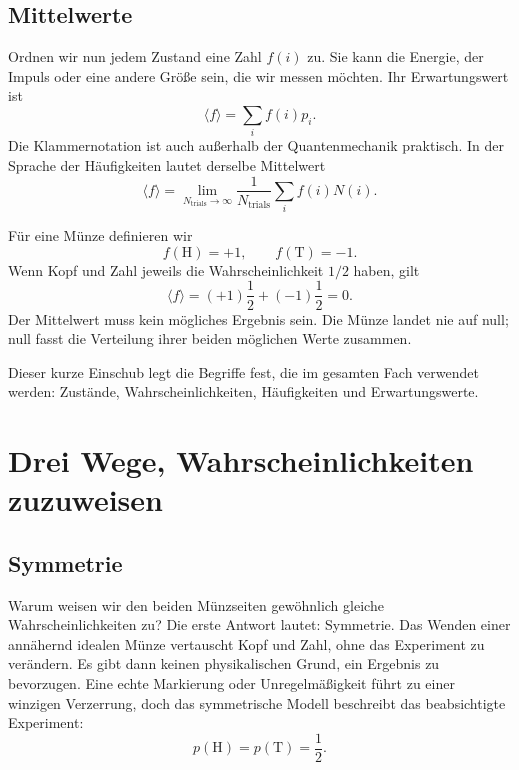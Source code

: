 \subsection{Mittelwerte}

Ordnen wir nun jedem Zustand eine Zahl \(f(i)\) zu. Sie kann die Energie, der Impuls oder eine andere Größe sein, die wir messen möchten. Ihr Erwartungswert ist
\begin{equation}
 \langle f\rangle=\sum_i f(i)p_i.
 \label{eq:sm1-expectation}
\end{equation}
Die Klammernotation ist auch außerhalb der Quantenmechanik praktisch. In der Sprache der Häufigkeiten lautet derselbe Mittelwert
\begin{equation}
 \langle f\rangle
 =
 \lim_{N_{\mathrm{trials}}\to\infty}
 \frac{1}{N_{\mathrm{trials}}}
 \sum_i f(i)N(i).
 \label{eq:sm1-frequency-average}
\end{equation}

Für eine Münze definieren wir
\begin{equation}
 f(\mathrm{H})=+1,
 \qquad
 f(\mathrm{T})=-1.
\end{equation}
Wenn Kopf und Zahl jeweils die Wahrscheinlichkeit \(1/2\) haben, gilt
\begin{equation}
 \langle f\rangle
 =(+1)\frac12+(-1)\frac12=0.
\end{equation}
Der Mittelwert muss kein mögliches Ergebnis sein. Die Münze landet nie auf null; null fasst die Verteilung ihrer beiden möglichen Werte zusammen.

Dieser kurze Einschub legt die Begriffe fest, die im gesamten Fach verwendet werden: Zustände, Wahrscheinlichkeiten, Häufigkeiten und Erwartungswerte.

\section{Drei Wege, Wahrscheinlichkeiten zuzuweisen}

\subsection{Symmetrie}

Warum weisen wir den beiden Münzseiten gewöhnlich gleiche Wahrscheinlichkeiten zu? Die erste Antwort lautet: Symmetrie. Das Wenden einer annähernd idealen Münze vertauscht Kopf und Zahl, ohne das Experiment zu verändern. Es gibt dann keinen physikalischen Grund, ein Ergebnis zu bevorzugen. Eine echte Markierung oder Unregelmäßigkeit führt zu einer winzigen Verzerrung, doch das symmetrische Modell beschreibt das beabsichtigte Experiment:
\begin{equation}
 p(\mathrm{H})=p(\mathrm{T})=\frac12.
\end{equation}

